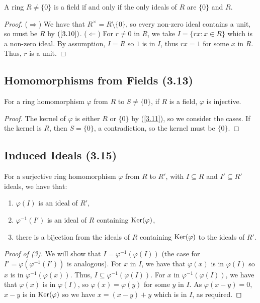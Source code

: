 A ring $R \neq \{0\}$ is a field if and only if the only ideals
of $R$ are $\{0\}$ and $R$.

\begin{proof}
    ($\Longrightarrow$) We have that $R^\times = R \setminus \{0\}$,
    so every non-zero ideal contains a unit, so must be $R$ by 
    $(\ref{3.10})$. \bs
    ($\Longleftarrow$) For $r \neq 0$ in $R$, we take 
    $I = \{rx : x \in R\}$ which is a non-zero ideal. By assumption,
    $I = R$ so $1$ is in $I$, thus $rx = 1$ for some $x$ in $R$.
    Thus, $r$ is a unit.
\end{proof}

\subsection{Homomorphisms from Fields (3.13)} \label{3.13}

For a ring homomorphism $\varphi$ from $R$ to $S \neq \{0\}$, if $R$
is a field, $\varphi$ is injective.

\begin{proof}
    The kernel of $\varphi$ is either $R$ or $\{0\}$ by (\ref{3.11}),
    so we consider the cases.
    If the kernel is $R$, then $S = \{0\}$, a contradiction,
    so the kernel must be $\{0\}$.
\end{proof}

\subsection{Induced Ideals (3.15)} \label{3.15}

For a surjective ring homomorphism $\varphi$ from $R$ to $R'$,
with $I \subseteq R$ and $I' \subseteq R'$ ideals,
we have that: \begin{enumerate}
    \item $\varphi(I)$ is an ideal of $R'$,
    \item $\varphi^{-1}(I')$ is an ideal of $R$ containing
        $\operatorname{Ker}(\varphi)$,
    \item there is a bijection from the ideals of $R$ containing
        $\operatorname{Ker}(\varphi)$ to the ideals of $R'$.
\end{enumerate}

\begin{proof}[Proof of (3)]
    We will show that $I = \varphi^{-1}(\varphi(I))$ (the case for
    $I' = \varphi(\varphi^{-1}(I'))$ is analogous). For $x$ in $I$,
    we have that $\varphi(x)$ is in $\varphi(I)$ so $x$ is in 
    $\varphi^{-1}(\varphi(x))$. Thus, 
    $I \subseteq \varphi^{-1}(\varphi(I))$. For $x$ in 
    $\varphi^{-1}(\varphi(I))$, we have that $\varphi(x)$ is in
    $\varphi(I)$, so $\varphi(x) = \varphi(y)$ for some $y$ in $I$.
    As $\varphi(x - y) = 0$, $x - y$ is in $\operatorname{Ker}(\varphi)$ so we have
    $x = (x - y) + y$ which is in $I$, as required.  
\end{proof}

